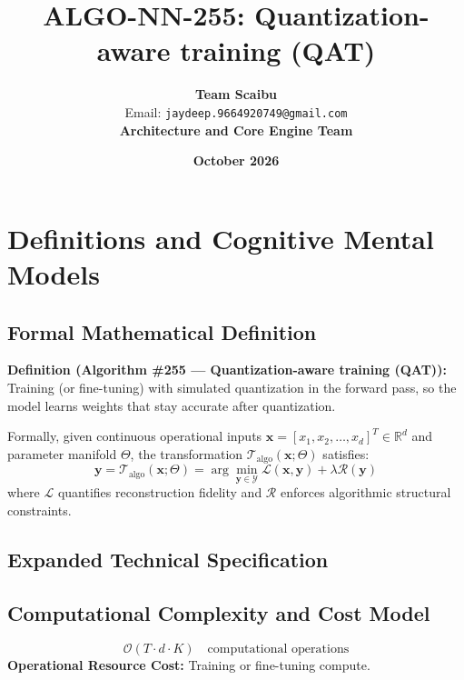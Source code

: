 \documentclass[11pt,a4paper]{article}
\title{\textbf{ALGO-NN-255: Quantization-aware training (QAT)}}
\author{\textbf{Team Scaibu} \\ \small Email: \texttt{jaydeep.9664920749@gmail.com} \\ \small \textbf{Architecture and Core Engine Team}}
\date{\textbf{October 2026}}
\theoremstyle{definition}
\begin{document}
\maketitle

\section{Definitions and Cognitive Mental Models}

\subsection{Formal Mathematical Definition}
\textbf{Definition (Algorithm \#255 --- Quantization-aware training (QAT)):}
Training (or fine-tuning) with simulated quantization in the forward pass, so the model learns weights that stay accurate after quantization.

Formally, given continuous operational inputs $\mathbf{x} = [x_1, x_2, \dots, x_d]^T \in \mathbb{R}^d$ and parameter manifold $\Theta$, the transformation $\mathcal{T}_{\text{algo}}(\mathbf{x}; \Theta)$ satisfies:
{\boldmath
\begin{equation}
\mathbf{y} = \mathcal{T}_{\text{algo}}(\mathbf{x}; \Theta) = \arg\min_{\mathbf{y} \in \mathcal{Y}} \mathcal{L}(\mathbf{x}, \mathbf{y}) + \lambda \mathcal{R}(\mathbf{y})
\end{equation}
}
where $\mathcal{L}$ quantifies reconstruction fidelity and $\mathcal{R}$ enforces algorithmic structural constraints.

\subsection{Expanded Technical Specification}

\subsection{Computational Complexity and Cost Model}
\begin{equation}
\mathcal{O}(T \cdot d \cdot K) \quad \text{computational operations}
\end{equation}
\textbf{Operational Resource Cost:} Training or fine-tuning compute.
\end{document}
